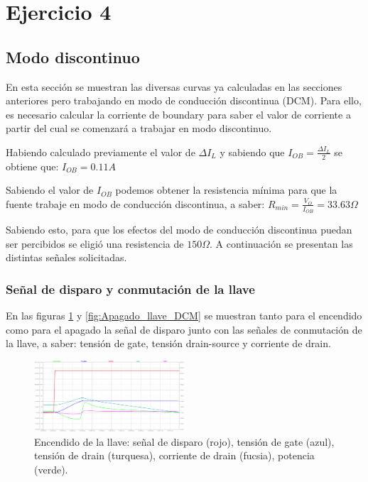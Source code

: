 \documentclass[e4_tp1_main.tex]{subfiles}
\begin{document}
	
	\section{Ejercicio 4}
	
	\subsection{Modo discontinuo}
	En esta sección se muestran las diversas curvas ya calculadas en las secciones anteriores pero trabajando en modo de conducción discontinua (DCM). Para ello, es necesario calcular la corriente de boundary para saber el valor de corriente a partir del cual se comenzará a trabajar en modo discontinuo.
	
	Habiendo calculado previamente el valor de $\Delta I_{L}$ y sabiendo que $I_{OB}=\frac{\Delta I_{L}}{2}$ se obtiene que: $I_{OB}=0.11A$    

	
	Sabiendo el valor de $I_{OB}$ podemos obtener la resistencia mínima para que la fuente trabaje en modo de conducción discontinua, a saber: $R_{min}=\frac{V_O}{I_{OB}}=33.63\Omega$

	
	Sabiendo esto, para que los efectos del modo de conducción discontinua puedan ser percibidos se eligió una resistencia de $150\Omega$.
	A continuación se presentan las distintas señales solicitadas.
	
	\subsubsection{Señal de disparo y conmutación de la llave}
	En las figuras \ref{fig:Encendido_llave_DCM} y \ref{fig:Apagado_llave_DCM} se muestran tanto para el encendido como para el apagado la señal de disparo junto con las señales de conmutación de la llave, a saber: tensión de gate, tensión drain-source y corriente de drain.
	
 	\begin{figure}
		\centering
		\includegraphics[width=0.5\textwidth]{images/ej4/fig1.png}
		\caption{Encendido de la llave: señal de disparo (rojo), tensi\'on de gate (azul), tensi\'on de drain (turquesa), corriente de drain (fucsia), potencia (verde).}
		\label{fig:Encendido_llave_DCM}
	\end{figure}
	
\end{document}
